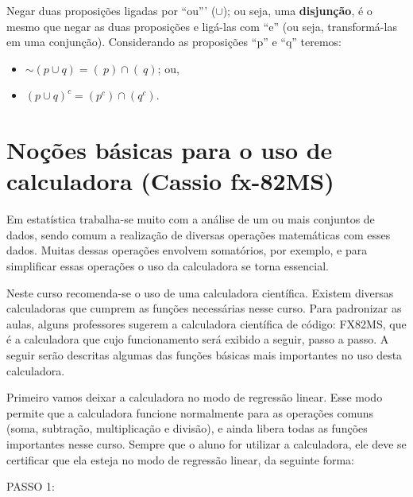 \documentclass[
]{book}
\providecommand{\tightlist}{%
  \setlength{\itemsep}{0pt}\setlength{\parskip}{0pt}}
\begin{document}
\hfill\break

Negar duas proposições ligadas por ``ou''' (\(\cup\)); ou seja, uma \textbf{disjunção}, é o mesmo que negar as duas proposições e ligá-las com ``e'' (ou seja, transformá-las em uma conjunção). Considerando as proposições ``p'' e ``q'' teremos:

\hfill\break

\begin{itemize}
\tightlist
\item
  \(\sim (p \cup q) = (~p) \cap (~q)\); ou,\\
\item
  \((p \cup q)^{c}= (p^{c}) \cap (q^{c})\).
\end{itemize}

\hypertarget{nouxe7uxf5es-buxe1sicas-para-o-uso-de-calculadora-cassio-fx-82ms}{%
\section{Noções básicas para o uso de calculadora (Cassio fx-82MS)}\label{nouxe7uxf5es-buxe1sicas-para-o-uso-de-calculadora-cassio-fx-82ms}}

Em estatística trabalha-se muito com a análise de um ou mais conjuntos de dados, sendo comum a realização de diversas operações matemáticas com esses dados. Muitas dessas operações envolvem somatórios, por exemplo, e para simplificar essas operações o uso da calculadora se torna essencial.

Neste curso recomenda-se o uso de uma calculadora científica. Existem diversas calculadoras que cumprem as funções necessárias nesse curso. Para padronizar as aulas, alguns professores sugerem a calculadora científica de código: FX82MS, que é a calculadora que cujo funcionamento será exibido a seguir, passo a passo. A seguir serão descritas algumas das funções básicas mais importantes no uso desta calculadora.

Primeiro vamos deixar a calculadora no modo de regressão linear. Esse modo permite que a calculadora
funcione normalmente para as operações comuns (soma, subtração, multiplicação e divisão), e ainda libera
todas as funções importantes nesse curso. Sempre que o aluno for utilizar a calculadora, ele deve se certificar que ela esteja no modo de regressão linear, da seguinte forma:

PASSO 1:
\end{document}

